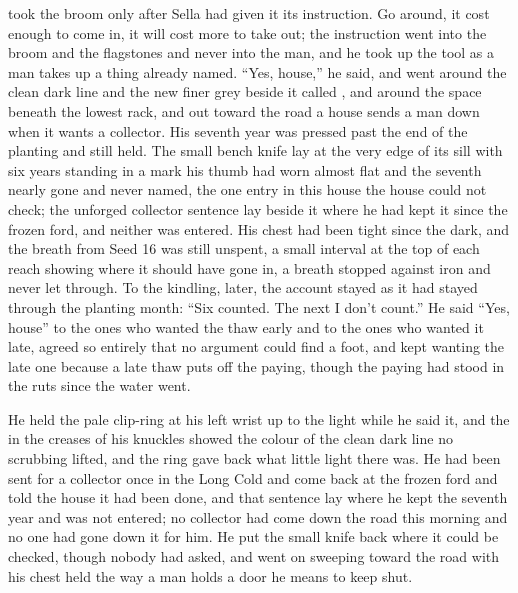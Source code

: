  took the broom only after Sella had given it its instruction. Go around, it cost enough to come in, it will cost more to take out; the instruction went into the broom and the flagstones and never into the man, and he took up the tool as a man takes up a thing already named. “Yes, house,” he said, and went around the clean dark line and the new finer grey beside it called , and around the space beneath the lowest rack, and out toward the road a house sends a man down when it wants a collector. His seventh year was pressed past the end of the planting and still held. The small bench knife lay at the very edge of its sill with six years standing in a mark his thumb had worn almost flat and the seventh nearly gone and never named, the one entry in this house the house could not check; the unforged collector sentence lay beside it where he had kept it since the frozen ford, and neither was entered. His chest had been tight since the dark, and the breath from Seed 16 was still unspent, a small interval at the top of each reach showing where it should have gone in, a breath stopped against iron and never let through. To the kindling, later, the account stayed as it had stayed through the planting month: “Six counted. The next I don't count.” He said “Yes, house” to the ones who wanted the thaw early and to the ones who wanted it late, agreed so entirely that no argument could find a foot, and kept wanting the late one because a late thaw puts off the paying, though the paying had stood in the ruts since the water went.

He held the pale clip-ring at his left wrist up to the light while he said it, and the  in the creases of his knuckles showed the colour of the clean dark line no scrubbing lifted, and the ring gave back what little light there was. He had been sent for a collector once in the Long Cold and come back at the frozen ford and told the house it had been done, and that sentence lay where he kept the seventh year and was not entered; no collector had come down the road this morning and no one had gone down it for him. He put the small knife back where it could be checked, though nobody had asked, and went on sweeping toward the road with his chest held the way a man holds a door he means to keep shut.

\scenebreak

